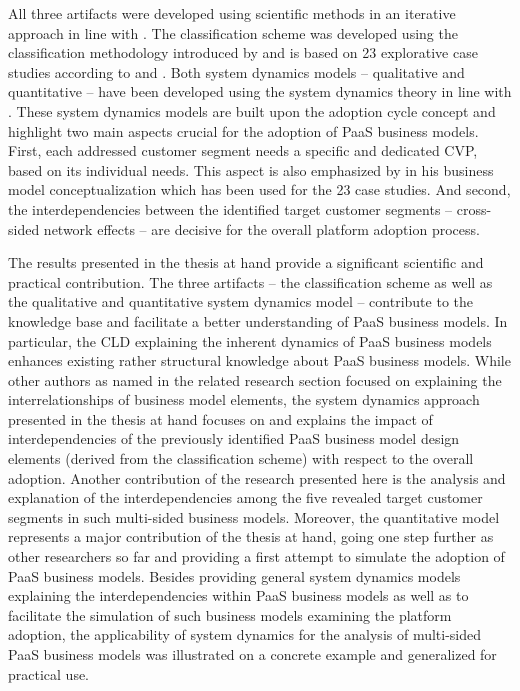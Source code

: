 All three artifacts were developed using scientific methods in an iterative approach in line with \citet{Hevner2007}. The classification scheme was developed using the classification methodology introduced by \citet{Fettke2003} and is based on 23 explorative case studies according to \citet{Eisenhardt1989} and \citet{Yin2008}. Both system dynamics models -- qualitative and quantitative -- have been developed using the system dynamics theory in line with \citet{Sterman2000,Sterman2001}. These system dynamics models are built upon the adoption cycle concept \citep{Sterman2001} and highlight two main aspects crucial for the adoption of \ac{PaaS} business models. First, each addressed customer segment needs a specific and dedicated \acf{CVP}, based on its individual needs. This aspect is also emphasized by \citet{Johnson2008} in his business model conceptualization which has been used for the 23 case studies. And second, the interdependencies between the identified target customer segments -- cross-sided network effects -- are decisive for the overall platform adoption process.

The results presented in the thesis at hand provide a significant scientific and practical contribution. The three artifacts -- the classification scheme as well as the qualitative and quantitative system dynamics model -- contribute to the knowledge base and facilitate a better understanding of \ac{PaaS} business models. In particular, the \ac{CLD} explaining the inherent dynamics of \ac{PaaS} business models enhances existing rather structural knowledge about \ac{PaaS} business models. While other authors as named in the related research section focused on explaining the interrelationships of business model elements, the system dynamics approach presented in the thesis at hand focuses on and explains the impact of interdependencies of the previously identified \ac{PaaS} business model design elements (derived from the classification scheme) with respect to the overall adoption. Another contribution of the research presented here is the analysis and explanation of the interdependencies among the five revealed target customer segments in such multi-sided business models. Moreover, the quantitative model represents a major contribution of the thesis at hand, going one step further as other researchers so far and providing a first attempt to simulate the adoption of \ac{PaaS} business models. Besides providing general system dynamics models explaining the interdependencies within \ac{PaaS} business models as well as to facilitate the simulation of such business models examining the platform adoption, the applicability of system dynamics for the analysis of multi-sided \ac{PaaS} business models was illustrated on a concrete example and generalized for practical use.

